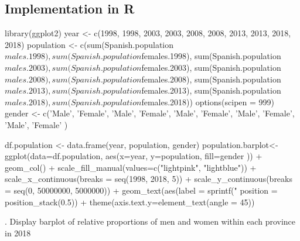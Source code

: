 \documentclass[12pt, oneside]{report}\usepackage[]{graphicx}\usepackage[]{color}
\begin{document}
\subsection*{Implementation in R}
\begin{Schunk}
\begin{Sinput}
library(ggplot2)
year <- c(1998, 1998, 2003, 2003, 2008, 2008, 2013, 2013, 2018, 2018)
population <- c(sum(Spanish.population$males.1998), 
                sum(Spanish.population$females.1998), 
                sum(Spanish.population$males.2003), 
                sum(Spanish.population$females.2003), 
                sum(Spanish.population$males.2008), 
                sum(Spanish.population$females.2008), 
                sum(Spanish.population$males.2013), 
                sum(Spanish.population$females.2013), 
                sum(Spanish.population$males.2018), 
                sum(Spanish.population$females.2018))
options(scipen = 999)
gender <- c('Male', 'Female', 'Male', 'Female', 'Male', 
            'Female', 'Male', 'Female', 'Male', 'Female' )

df.population <- data.frame(year, population, gender)
population.barplot<-ggplot(data=df.population, 
                           aes(x=year, y=population, fill=gender )) +
                    geom_col() +
                    scale_fill_manual(values=c("lightpink", "lightblue")) +
                    scale_x_continuous(breaks = seq(1998, 2018, 5)) + 
                    scale_y_continuous(breaks = seq(0, 50000000, 5000000)) +
                    geom_text(aes(label = sprintf("%
                              position = position_stack(0.5)) +
                    theme(axis.text.y=element_text(angle = 45))
\end{Sinput}
\end{Schunk}

. Display barplot of relative proportions of men and women within each province in 2018
\end{document}
